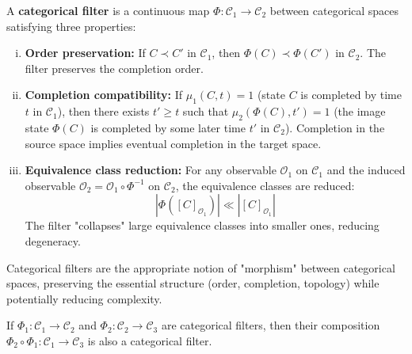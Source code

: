 \begin{definition}
\label{def:categorical_filter_formal}
A \textbf{categorical filter} is a continuous map $\Phi: \mathcal{C}_1 \to \mathcal{C}_2$ between categorical spaces satisfying three properties:
\begin{enumerate}[(i)]
    \item \textbf{Order preservation:} If $C \prec C'$ in $\mathcal{C}_1$, then $\Phi(C) \prec \Phi(C')$ in $\mathcal{C}_2$. The filter preserves the completion order.
    
    \item \textbf{Completion compatibility:} If $\mu_1(C, t) = 1$ (state $C$ is completed by time $t$ in $\mathcal{C}_1$), then there exists $t' \geq t$ such that $\mu_2(\Phi(C), t') = 1$ (the image state $\Phi(C)$ is completed by some later time $t'$ in $\mathcal{C}_2$). Completion in the source space implies eventual completion in the target space.
    
    \item \textbf{Equivalence class reduction:} For any observable $\mathcal{O}_1$ on $\mathcal{C}_1$ and the induced observable $\mathcal{O}_2 = \mathcal{O}_1 \circ \Phi^{-1}$ on $\mathcal{C}_2$, the equivalence classes are reduced:
    \begin{equation}
    |\Phi([C]_{\mathcal{O}_1})| \ll |[C]_{\mathcal{O}_1}|
    \label{eq:equivalence_reduction}
    \end{equation}
    The filter "collapses" large equivalence classes into smaller ones, reducing degeneracy.
\end{enumerate}
\end{definition}

Categorical filters are the appropriate notion of "morphism" between categorical spaces, preserving the essential structure (order, completion, topology) while potentially reducing complexity.

\begin{proposition}
\label{prop:filter_composition_formal}
If $\Phi_1: \mathcal{C}_1 \to \mathcal{C}_2$ and $\Phi_2: \mathcal{C}_2 \to \mathcal{C}_3$ are categorical filters, then their composition $\Phi_2 \circ \Phi_1: \mathcal{C}_1 \to \mathcal{C}_3$ is also a categorical filter.
\end{proposition}


